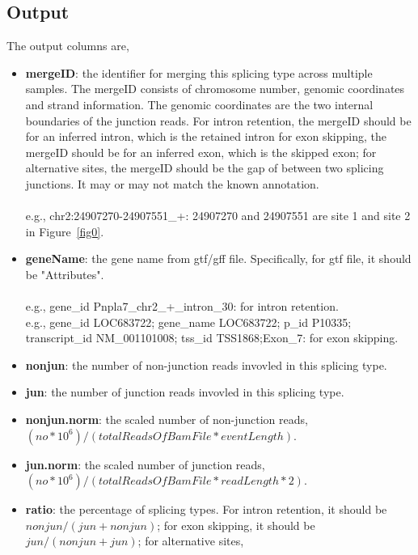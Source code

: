 \documentclass[a4paper]{article}
\begin{document}
\subsection{Output}
The output columns are, 
\begin{itemize}
\item \textbf{mergeID}: the identifier for merging this splicing type across multiple samples.
      The mergeID consists of chromosome number, genomic coordinates and strand information. The genomic coordinates are the two internal boundaries of the junction reads.  
      For intron retention, the mergeID should be for an inferred intron, which is the retained intron
      for exon skipping, the mergeID should be for an inferred exon, which is the skipped exon;
      for alternative sites, the mergeID should be the gap of between two splicing junctions.
      It may or may not match the known annotation. \\ \\
      e.g., chr2:24907270-24907551\_+: 24907270 and 24907551 are site 1 and site 2 in Figure~\ref{fig0}.
\item \textbf{geneName}: the gene name from gtf/gff file. Specifically, for gtf file,
      it should be "Attributes". \\ \\
      e.g., gene\_id Pnpla7\_chr2\_+\_intron\_30: for intron retention. \\
      e.g., gene\_id LOC683722; gene\_name LOC683722; p\_id P10335; transcript\_id NM\_001101008; tss\_id TSS1868;Exon\_7: for exon skipping. \\       
\item \textbf{nonjun}: the number of non-junction reads invovled in this splicing type.
\item \textbf{jun}: the number of junction reads invovled in this splicing type.
\item \textbf{nonjun.norm}: the scaled number of non-junction reads, $(no*10^6)/(totalReadsOfBamFile*eventLength)$.
\item \textbf{jun.norm}: the scaled number of junction reads, $(no*10^6)/(totalReadsOfBamFile*readLength*2)$.
\item \textbf{ratio}: the percentage of splicing types. For intron retention, it should
be $nonjun/(jun+nonjun)$; for exon skipping, it should be $jun/(nonjun+jun)$; for alternative sites,

\end{itemize}
\end{document}

